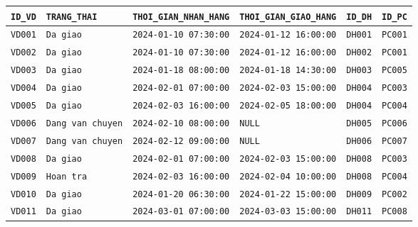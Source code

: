 \documentclass[11pt]{report}
\begin{document}
\begin{table}[H]
    \centering
    \renewcommand{\tabularxcolumn}[1]{m{#1}}
    \begin{tabularx}{\textwidth}{|>{\small}l|>{\small}l|>{\small}l|>{\small}l|>{\small}l|>{\raggedright\arraybackslash\small}X|} \hline
        \rowcolor{teal!30}
        \textbf{\texttt{ID\_VD}} & \textbf{\texttt{TRANG\_THAI}} & \textbf{\texttt{THOI\_GIAN\_NHAN\_HANG}} & \textbf{\texttt{THOI\_GIAN\_GIAO\_HANG}} & \textbf{\texttt{ID\_DH}} & \textbf{\texttt{ID\_PC}} \\ \hline
        \texttt{VD001} & \texttt{Da giao}         & \texttt{2024-01-10 07:30:00} & \texttt{2024-01-12 16:00:00} & \texttt{DH001} & \texttt{PC001} \\ \hline
        \texttt{VD002} & \texttt{Da giao}         & \texttt{2024-01-10 07:30:00} & \texttt{2024-01-12 16:00:00} & \texttt{DH002} & \texttt{PC001} \\ \hline
        \texttt{VD003} & \texttt{Da giao}         & \texttt{2024-01-18 08:00:00} & \texttt{2024-01-18 14:30:00} & \texttt{DH003} & \texttt{PC005} \\ \hline
        \texttt{VD004} & \texttt{Da giao}         & \texttt{2024-02-01 07:00:00} & \texttt{2024-02-03 15:00:00} & \texttt{DH004} & \texttt{PC003} \\ \hline
        \texttt{VD005} & \texttt{Da giao}         & \texttt{2024-02-03 16:00:00} & \texttt{2024-02-05 18:00:00} & \texttt{DH004} & \texttt{PC004} \\ \hline
        \texttt{VD006} & \texttt{Dang van chuyen} & \texttt{2024-02-10 08:00:00} & \texttt{NULL}                & \texttt{DH005} & \texttt{PC006} \\ \hline
        \texttt{VD007} & \texttt{Dang van chuyen} & \texttt{2024-02-12 09:00:00} & \texttt{NULL}                & \texttt{DH006} & \texttt{PC007} \\ \hline
        \texttt{VD008} & \texttt{Da giao}         & \texttt{2024-02-01 07:00:00} & \texttt{2024-02-03 15:00:00} & \texttt{DH008} & \texttt{PC003} \\ \hline
        \texttt{VD009} & \texttt{Hoan tra}        & \texttt{2024-02-03 16:00:00} & \texttt{2024-02-04 10:00:00} & \texttt{DH008} & \texttt{PC004} \\ \hline
        \texttt{VD010} & \texttt{Da giao}         & \texttt{2024-01-20 06:30:00} & \texttt{2024-01-22 15:00:00} & \texttt{DH009} & \texttt{PC002} \\ \hline
        \texttt{VD011} & \texttt{Da giao}         & \texttt{2024-03-01 07:00:00} & \texttt{2024-03-03 15:00:00} & \texttt{DH011} & \texttt{PC008} \\ \hline

\end{tabularx}
\end{table}
\end{document}
